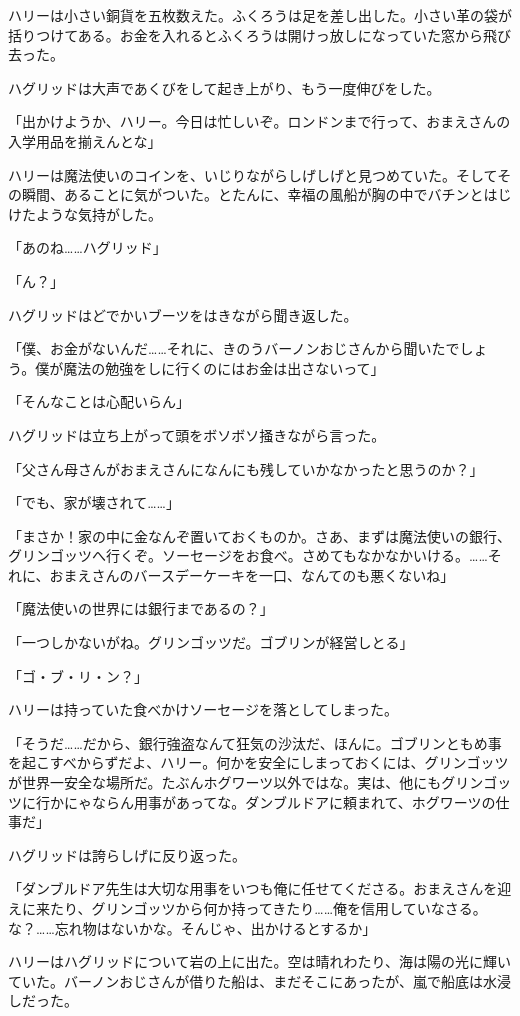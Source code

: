 \documentclass[10pt,a4paper]{article}
\begin{document}
\begin{CJK}{UTF8}{min}
ハリーは小さい銅貨を五枚数えた。ふくろうは足を差し出した。小さい革の袋が括りつけてある。お金を入れるとふくろうは開けっ放しになっていた窓から飛び去った。

ハグリッドは大声であくびをして起き上がり、もう一度伸びをした。

「出かけようか、ハリー。今日は忙しいぞ。ロンドンまで行って、おまえさんの入学用品を揃えんとな」

ハリーは魔法使いのコインを、いじりながらしげしげと見つめていた。そしてその瞬間、あることに気がついた。とたんに、幸福の風船が胸の中でバチンとはじけたような気持がした。

「あのね……ハグリッド」

「ん？」

ハグリッドはどでかいブーツをはきながら聞き返した。

「僕、お金がないんだ……それに、きのうバーノンおじさんから聞いたでしょう。僕が魔法の勉強をしに行くのにはお金は出さないって」

「そんなことは心配いらん」

ハグリッドは立ち上がって頭をボソボソ掻きながら言った。

「父さん母さんがおまえさんになんにも残していかなかったと思うのか？」

「でも、家が壊されて……」

「まさか！家の中に金なんぞ置いておくものか。さあ、まずは魔法使いの銀行、グリンゴッツへ行くぞ。ソーセージをお食べ。さめてもなかなかいける。……それに、おまえさんのバースデーケーキを一口、なんてのも悪くないね」

「魔法使いの世界には銀行まであるの？」

「一つしかないがね。グリンゴッツだ。ゴブリンが経営しとる」

「ゴ・ブ・リ・ン？」

ハリーは持っていた食べかけソーセージを落としてしまった。

「そうだ……だから、銀行強盗なんて狂気の沙汰だ、ほんに。ゴブリンともめ事を起こすべからずだよ、ハリー。何かを安全にしまっておくには、グリンゴッツが世界一安全な場所だ。たぶんホグワーツ以外ではな。実は、他にもグリンゴッツに行かにゃならん用事があってな。ダンブルドアに頼まれて、ホグワーツの仕事だ」

ハグリッドは誇らしげに反り返った。

「ダンブルドア先生は大切な用事をいつも俺に任せてくださる。おまえさんを迎えに来たり、グリンゴッツから何か持ってきたり……俺を信用していなさる。な？……忘れ物はないかな。そんじゃ、出かけるとするか」

ハリーはハグリッドについて岩の上に出た。空は晴れわたり、海は陽の光に輝いていた。バーノンおじさんが借りた船は、まだそこにあったが、嵐で船底は水浸しだった。


\end{CJK}
\end{document}

